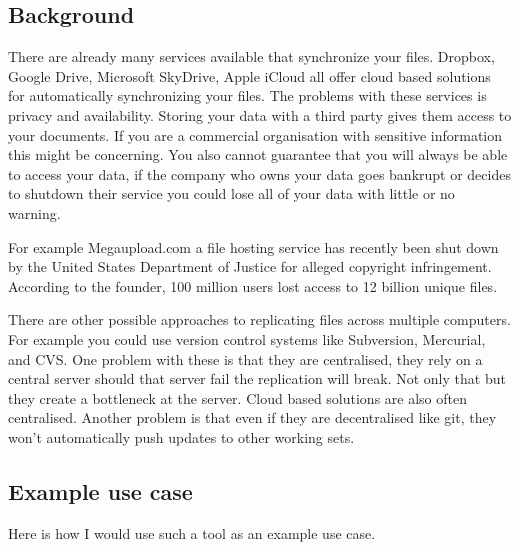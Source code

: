 \documentclass[12pt]{article}
\begin{document}
\subsection{Background}
There are already many services available
that synchronize your
files. Dropbox, Google Drive, Microsoft SkyDrive, Apple iCloud
all offer cloud based solutions for automatically
synchronizing your files. The problems with these
services is privacy and availability. Storing your data with a
third party gives them access to your documents. If you
are a commercial organisation with sensitive information
this might be concerning. You also cannot guarantee
that you will always be able to access your data, if
the company who owns your data goes bankrupt or
decides to shutdown their service
you could lose all
of your data with little or no warning. 

For example Megaupload.com a file hosting service
has recently been shut down by the United States Department of
Justice for alleged copyright infringement. According to
the founder, 100 million users lost access to 12 billion
unique files\cite{dotcom-trial}.

There are other possible approaches to replicating files
across multiple computers. For example you could use
version control systems like Subversion, Mercurial, and
CVS. One problem with these is that they are
centralised, 
they rely on a central server should that
server fail the replication will break. Not only
that but they create a bottleneck at the server.
Cloud based solutions are also often centralised. 
Another problem is that even if they are decentralised
like git, they won't automatically push updates to other
working sets.



\subsection*{Example use case}
Here is how I would use such a tool as an example use case.
\end{document}
